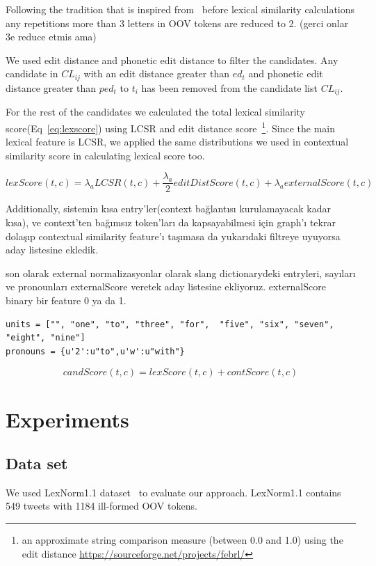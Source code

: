 \documentclass[preprint,review,12pt]{elsarticle}
\begin{document}
Following the tradition that is inspired from~\cite{Kaufmann2010} before lexical similarity calculations any repetitions more than 3 letters in OOV tokens are reduced to 2. (gerci onlar 3e reduce etmis ama)

We used edit distance and phonetic edit distance to filter the candidates. Any candidate in $CL_{ij}$ with an edit distance greater than $ed_t$ and phonetic edit distance greater than $ped_t$ to $t_i$ has been removed from the candidate list $CL_{ij}$.

For the rest of the candidates we calculated the total lexical similarity score(Eq~\ref{eq:lexscore}) using LCSR and edit distance score~\footnote{an approximate string comparison measure (between 0.0 and 1.0) using the edit distance \url{https://sourceforge.net/projects/febrl/}}. Since the main lexical feature is LCSR, we applied the same distributions we used in contextual similarity score in calculating lexical score too.

\begin{equation}
lexScore(t,c) = \lambda_a LCSR(t,c) + \frac{\lambda_a} 2 editDistScore(t,c) + \lambda_a externalScore(t,c)
\label{eq:lexscore}
\end{equation}

Additionally, sistemin kısa entry'ler(context bağlantısı kurulamayacak kadar kısa), ve context'ten bağımsız token'ları da kapsayabilmesi için graph'ı tekrar dolaşıp contextual similarity feature'ı taşımasa da yukarıdaki filtreye uyuyorsa aday listesine ekledik.


son olarak external normalizasyonlar olarak slang dictionarydeki entryleri, sayıları ve pronounları externalScore veretek aday listesine ekliyoruz. externalScore binary bir feature 0 ya da 1.
\begin{verbatim}
units = ["", "one", "to", "three", "for",  "five", "six", "seven", "eight", "nine"]
pronouns = {u'2':u"to",u'w':u"with"}
\end{verbatim}


\begin{equation}
candScore(t,c) = lexScore(t,c) + contScore(t,c)
\label{eq:candscore}
\end{equation}

\section{Experiments}
\label{sec:experiments}

\subsection{Data set}
We used LexNorm1.1 dataset~\cite{Han:2011:LNS:2002472.2002520} to evaluate our approach. LexNorm1.1 contains 549 tweets with 1184 ill-formed OOV tokens.
\end{document}
